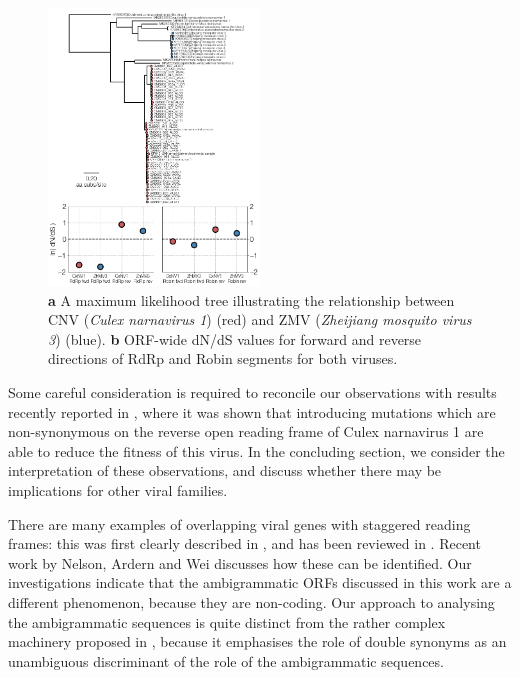 \documentclass[unnumsec,webpdf,contemporary,large,namedate]{oup-authoring-template}%
\theoremstyle{thmstyleone}%
\theoremstyle{thmstyletwo}%
\theoremstyle{thmstylethree}%
\begin{document}
\begin{figure}
\begin{center}
\includegraphics[width=0.5\textwidth]{narna-zhcx.png}
\caption{\label{fig: 1}
{\bf a} A maximum likelihood tree illustrating the relationship between CNV (\emph{Culex narnavirus 1}) (red) and
ZMV (\emph{Zheijiang mosquito virus 3}) (blue). {\bf b} ORF-wide dN/dS values for forward and reverse directions of RdRp and Robin segments for both viruses.
}
\end{center}
\end{figure}

Some careful consideration is required to reconcile our observations with results recently reported
in \cite{Ret+20}, where it was shown that introducing mutations which are non-synonymous on the reverse
open reading frame of Culex narnavirus 1 are able to reduce the fitness of this virus.
In the concluding section, we consider the interpretation of these observations, and discuss whether there
may be implications for other viral families.

There are many examples of overlapping viral genes with staggered reading frames: this was first
clearly described in \cite{Bar+76}, and has been reviewed in \cite{Chi+10}. Recent
work by Nelson, Ardern and Wei \citep{Nel+20} discusses how these can be identified.
Our investigations indicate that the ambigrammatic ORFs discussed in this work are a
different phenomenon, because they are non-coding. Our approach to analysing the ambigrammatic
sequences is quite distinct from the rather complex machinery proposed in \cite{Nel+20}, because
it emphasises the role of double synonyms as an unambiguous discriminant of the role of the ambigrammatic
sequences.
\end{document}
